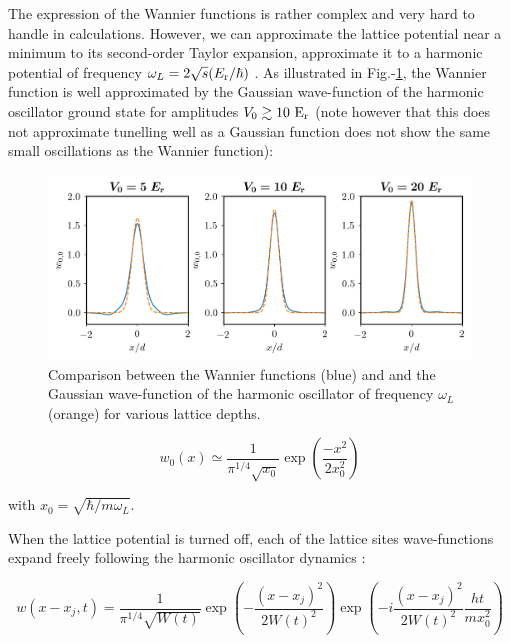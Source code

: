 \noindent The expression of the Wannier functions is rather complex and very hard to handle in calculations. However, we can approximate the lattice potential near a minimum to its second-order Taylor expansion, \ie approximate it to a harmonic potential of frequency $\omega_L=2 \sqrt{s} (E_{\rm{r}}/\hbar)$ \cite{toth2008theory}. As illustrated in Fig.-\ref{fig:wannier_oh}, the Wannier function is well approximated by the Gaussian wave-function of the harmonic oscillator ground state for amplitudes $V_0 \gtrsim 10 \ \rm{E_r}$ (note however that this does not approximate tunelling well as a Gaussian function does not show the same small oscillations as the Wannier function):

\begin{figure}
    \centering
    \includegraphics[width=\textwidth]{Fig/Chapter2/wannier_oh.png}
    \caption[Comparison between the Wannier functions and and the Gaussian wave-function of the harmonic oscillator of frequency $\omega_L$ for various lattice depths.]{Comparison between the Wannier functions (blue) and and the Gaussian wave-function of the harmonic oscillator of frequency $\omega_L$ (orange) for various lattice depths.}
    \label{fig:wannier_oh}
\end{figure}


\begin{equation}
    w_0(x) \simeq \frac{1}{\pi^{1 / 4} \sqrt{x_{0}}} \exp \left(\frac{-x^{2}}{2 x_{0}^{2}}\right)
\end{equation}

\noindent with $x_{0}=\sqrt{\hbar / m \omega_{L}}$.

When the lattice potential is turned off, each of the lattice sites wave-functions expand freely following the harmonic oscillator dynamics \cite{toth2008theory}:

\begin{equation}
    w\left(x-x_{j}, t\right)=\frac{1}{\pi^{1 / 4} \sqrt{W(t)}} \exp \left(-\frac{\left(x-x_{j}\right)^{2}}{2 W(t)^{2}}\right) \exp \left(-i \frac{\left(x-x_{j}\right)^{2}}{2 W(t)^{2}} \frac{h t}{m x_{0}^{2}}\right)
    \label{eq:time_dependent_wannier}
\end{equation}

